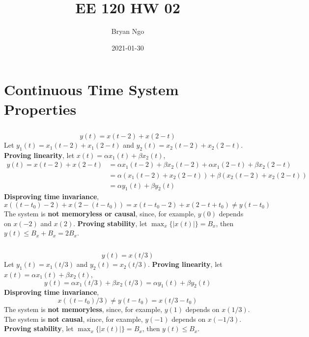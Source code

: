 \documentclass{article}
\title{EE 120 HW 02}
\author{Bryan Ngo}
\date{2021-01-30}
\begin{document}
\maketitle

\section{Continuous Time System Properties}

\subsection{}

\begin{equation}
    y(t) = x(t - 2) + x(2 - t)
\end{equation}
Let \(y_1(t) = x_1(t - 2) + x_1(2 - t)\) and \(y_2(t) = x_2(t - 2) + x_2(2 - t)\).
\textbf{Proving linearity}, let \(x(t) = \alpha x_1(t) + \beta x_2(t)\),
\begin{align}
    y(t) = x(t - 2) + x(2 - t) &= \alpha x_1(t - 2) + \beta x_2(t - 2) + \alpha x_1(2 - t) + \beta x_2(2 - t) \\
    &= \alpha (x_1(t - 2) + x_2(2 - t)) + \beta (x_2(t - 2) + x_2(2 - t)) \\
    &= \alpha y_1(t) + \beta y_2(t)
\end{align}
\textbf{Disproving time invariance},
\begin{equation}
    x((t - t_0) - 2) + x(2 - (t - t_0)) = x(t - t_0 - 2) + x(2 - t + t_0) \neq y(t - t_0)
\end{equation}
The system is \textbf{not memoryless or causal}, since, for example, \(y(0)\) depends on \(x(-2)\) and \(x(2)\).
\textbf{Proving stability}, let \(\max_x\{|x(t)|\} = B_x\), then \(y(t) \leqslant B_x + B_x = 2B_x\).

\subsection{}

\begin{equation}
    y(t) = x(t / 3)
\end{equation}
Let \(y_1(t) = x_1(t / 3)\) and \(y_2(t) = x_2(t / 3)\).
\textbf{Proving linearity}, let \(x(t) = \alpha x_1(t) + \beta x_2(t)\),
\begin{equation}
    y(t) = \alpha x_1(t / 3) + \beta x_2(t / 3) = \alpha y_1(t) + \beta y_2(t)
\end{equation}
\textbf{Disproving time invariance},
\begin{equation}
    x((t - t_0) / 3) \neq y(t - t_0) = x(t / 3 - t_0)
\end{equation}
The system is \textbf{not memoryless}, since, for example, \(y(1)\) depends on \(x(1 / 3)\).
The system is \textbf{not causal}, since, for example, \(y(-1)\) depends on \(x(-1 / 3)\).
\textbf{Proving stability}, let \(\max_x\{|x(t)|\} = B_x\), then \(y(t) \leqslant B_x\).
\end{document}
